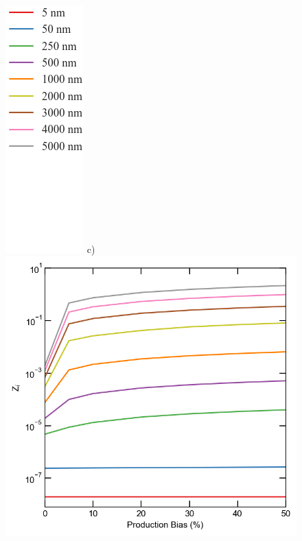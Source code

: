 \documentclass[utf8]{frontiersSCNS} %
\begin{document}
\begin{figure}[h!]
        \includegraphics[scale=0.35]{legend}
        c)\includegraphics[scale=0.55]{sink_strength_high_neutron_Zi_scaled_nolegend}

\end{figure}
\end{document}
